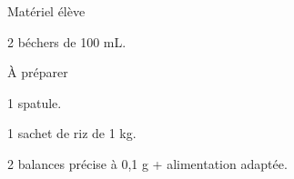 
\begin{boiteMateriel}{Matériel élève}
  \effectifSeconde

  \begin{protocole}
    \item 2 béchers de 100 mL.
  \end{protocole}
\end{boiteMateriel}


\begin{boiteMateriel}{À préparer}
  \begin{protocole}
    \item 1 spatule.
    \item 1 sachet de riz de 1 kg.
    \item 2 balances précise à 0,1 g + alimentation adaptée.
  \end{protocole}
\end{boiteMateriel}